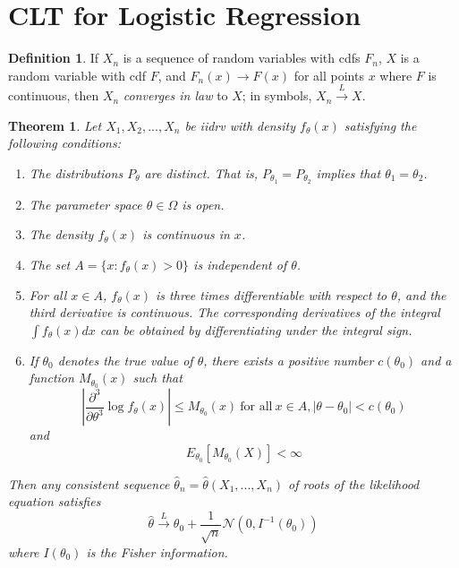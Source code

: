 \documentclass{article}
\newtheorem{theorem}{Theorem}
\newtheorem{lemma}{Lemma}
\theoremstyle{definition}
\newtheorem{defn}{Definition}
\DeclareMathOperator*{\argmax}{arg\,max}
\newcommand{\law}{\ensuremath{\xrightarrow{L}}}
\newcommand{\normal}[2]{\ensuremath{\mathcal{N}\left({{#1}},{{#2}}\right)}}
\begin{document}

\section {CLT for Logistic Regression}
\begin{defn}
If $X_n$ is a sequence of random variables with cdfs $F_n$,
$X$ is a random variable with cdf $F$,
and $F_n(x) \to F(x)$ for all points $x$ where $F$ is continuous,
then $X_n$ \emph{converges in law} to $X$;
in symbols, $X_n \law X$.
\end{defn}

\begin{theorem}
Let $X_1,X_2,...,X_n$ be iidrv with density $f_\theta(x)$ satisfying the following conditions:
\begin{enumerate}
\item
The distributions $P_\theta$ are distinct.
That is, $P_{\theta_1} = P_{\theta_2}$ implies that $\theta_1=\theta_2$.
\item
The parameter space $\theta\in\Omega$ is open.
\item
The density $f_\theta(x)$ is continuous in $x$.
\item
The set $A = \{x : f_\theta(x) > 0\}$ is independent of $\theta$.
\item
For all $x\in A$, $f_\theta(x)$ is three times differentiable with respect to $\theta$,
and the third derivative is continuous.
The corresponding derivatives of the integral $\int f_\theta(x)dx$ can be obtained by differentiating under the integral sign.
\item
If $\theta_0$ denotes the true value of $\theta$,
there exists a positive number $c(\theta_0)$ and a function $M_{\theta_0}(x)$ such that
\begin{equation}
\left|\frac{\partial^3}{\partial\theta^3} \log f_\theta(x)\right|
\le
M_{\theta_0}(x)
~\text{for all}~
x \in A, |\theta-\theta_0| < c(\theta_0)
\end{equation}
and
\begin{equation}
E_{\theta_0} [ M_{\theta_0}(X)] < \infty
\end{equation}
\end{enumerate}
Then any consistent sequence $\hat\theta_n = \hat\theta(X_1,...,X_n)$ of roots of the likelihood equation satisfies
\begin{equation}
\hat\theta
\law
\theta_0 + \frac{1}{\sqrt{n}}\normal{0}{I^{-1}(\theta_0)}
\end{equation}
where $I(\theta_0)$ is the Fisher information.
\end{theorem}
\end{document}
